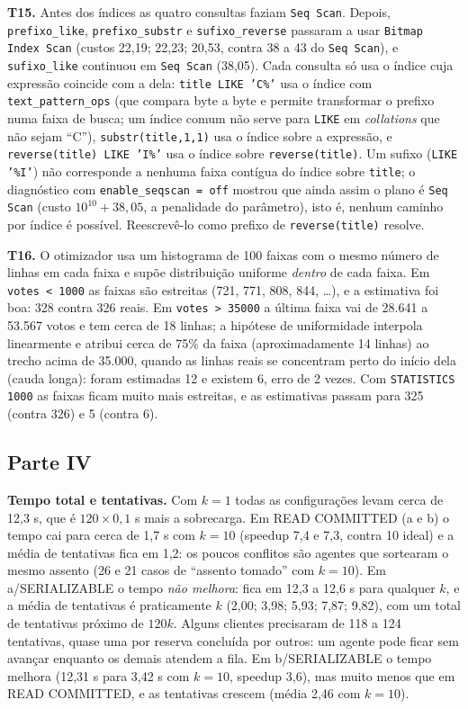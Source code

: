 \documentclass[11pt,a4paper]{article}
\newcommand{\tp}[1]{\texttt{#1}}
\begin{document}
\textbf{T15.} Antes dos índices as quatro consultas faziam \tp{Seq Scan}. Depois, \tp{prefixo\_like}, \tp{prefixo\_substr} e \tp{sufixo\_reverse} passaram a usar \tp{Bitmap Index Scan} (custos 22,19; 22,23; 20,53, contra 38 a 43 do \tp{Seq Scan}), e \tp{sufixo\_like} continuou em \tp{Seq Scan} (38,05). Cada consulta só usa o índice cuja expressão coincide com a dela: \tp{title LIKE 'C\%'} usa o índice com \tp{text\_pattern\_ops} (que compara byte a byte e permite transformar o prefixo numa faixa de busca; um índice comum não serve para \tp{LIKE} em \emph{collations} que não sejam ``C''), \tp{substr(title,1,1)} usa o índice sobre a expressão, e \tp{reverse(title) LIKE 'I\%'} usa o índice sobre \tp{reverse(title)}. Um sufixo (\tp{LIKE '\%I'}) não corresponde a nenhuma faixa contígua do índice sobre \tp{title}; o diagnóstico com \tp{enable\_seqscan = off} mostrou que ainda assim o plano é \tp{Seq Scan} (custo $10^{10} + 38{,}05$, a penalidade do parâmetro), isto é, nenhum caminho por índice é possível. Reescrevê-lo como prefixo de \tp{reverse(title)} resolve.

\textbf{T16.} O otimizador usa um histograma de 100 faixas com o mesmo número de linhas em cada faixa e supõe distribuição uniforme \emph{dentro} de cada faixa. Em \tp{votes < 1000} as faixas são estreitas (721, 771, 808, 844, \dots), e a estimativa foi boa: 328 contra 326 reais. Em \tp{votes > 35000} a última faixa vai de 28.641 a 53.567 votos e tem cerca de 18 linhas; a hipótese de uniformidade interpola linearmente e atribui cerca de 75\% da faixa (aproximadamente 14 linhas) ao trecho acima de 35.000, quando as linhas reais se concentram perto do início dela (cauda longa): foram estimadas 12 e existem 6, erro de 2 vezes. Com \tp{STATISTICS 1000} as faixas ficam muito mais estreitas, e as estimativas passam para 325 (contra 326) e 5 (contra 6).

\subsection*{Parte IV}
\textbf{Tempo total e tentativas.} Com $k=1$ todas as configurações levam cerca de 12,3 s, que é $120 \times 0{,}1$ s mais a sobrecarga. Em READ COMMITTED (a e b) o tempo cai para cerca de 1,7 s com $k = 10$ (speedup 7,4 e 7,3, contra 10 ideal) e a média de tentativas fica em 1,2: os poucos conflitos são agentes que sortearam o mesmo assento (26 e 21 casos de ``assento tomado'' com $k=10$). Em a/SERIALIZABLE o tempo \emph{não melhora}: fica em 12,3 a 12,6 s para qualquer $k$, e a média de tentativas é praticamente $k$ (2,00; 3,98; 5,93; 7,87; 9,82), com um total de tentativas próximo de $120k$. Alguns clientes precisaram de 118 a 124 tentativas, quase uma por reserva concluída por outros: um agente pode ficar sem avançar enquanto os demais atendem a fila. Em b/SERIALIZABLE o tempo melhora (12,31 s para 3,42 s com $k=10$, speedup 3,6), mas muito menos que em READ COMMITTED, e as tentativas crescem (média 2,46 com $k=10$).
\end{document}
